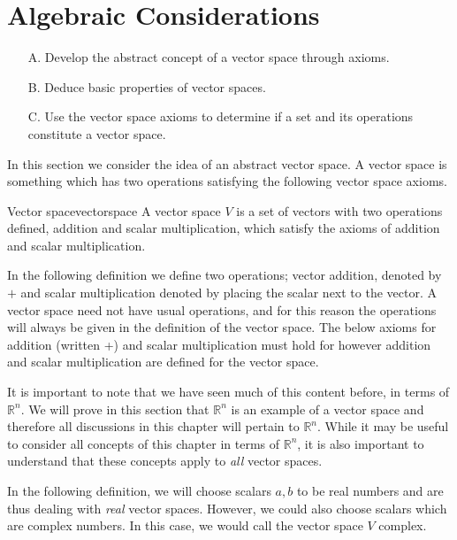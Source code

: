 \section{Algebraic Considerations}

\begin{outcome}
\begin{enumerate}
\item[A.] Develop the abstract concept of a vector space through axioms.

\item[B.] Deduce basic properties of vector spaces.

\item[C.]  Use the vector space axioms to determine if a set and its operations constitute a vector space.
\end{enumerate}
\end{outcome}

In this section we consider the idea of an abstract vector space. A vector space is
something which has two operations satisfying the following vector space
axioms.

\begin{definition}{Vector space}{vectorspace}
A vector space $V$ is a set of vectors with two operations defined, addition and scalar multiplication, which satisfy the axioms of addition and scalar multiplication. 
\end{definition}

In the following definition we define two operations; vector addition, denoted by $+$ and scalar
multiplication denoted by placing the scalar next to the vector. A vector space need not have usual operations, and for this reason the operations will always be given in the definition of the vector space. The below axioms for addition (written +) and scalar multiplication must hold for however addition and scalar multiplication are defined for the vector space.  

It is important to note that we have seen much of this content before, in terms of $\mathbb{R}^n$. We will prove in this section that $\mathbb{R}^n$ is an example of a vector space and therefore all discussions in this chapter will pertain to $\mathbb{R}^n$. While it may be useful to consider all concepts of this chapter in terms of $\mathbb{R}^n$, it is also important to understand that these concepts apply to \textit{all} vector spaces. 

In the following definition, we will choose scalars $a,b$ to be real numbers and are thus dealing with \textit{real} vector spaces. However, we could also choose scalars which are complex numbers. In this case, we would call the vector space $V$ complex. 

